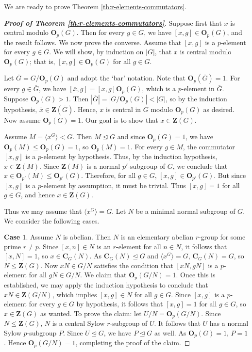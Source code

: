 \documentclass[twoside,a4paper,reqno,12pt]{amsart}
\newcommand{\<}{\langle}
\renewcommand{\>}{\rangle}
\newcommand{\la}{\langle}
\newcommand{\ra}{\rangle}
\newcommand{\leqs}{\leqslant}
\newcommand{\OB}{\mathbf{O}}
\newcommand{\CB}{\mathbf{C}}
\newcommand{\ZB}{\mathbf{Z}}
\renewcommand{\leq}{\leqs}
\renewcommand{\:}{\colon}
\theoremstyle{definition}
\begin{document}
 We are ready to prove Theorem \ref{th:r-elements-commutators}. 
 
 \begin{proof}[\textbf{Proof of Theorem \ref{th:r-elements-commutators}}]
 Suppose first that $x$ is central modulo $\OB_p(G)$. Then for every $g\in G$, we have $[x,g]\in \OB_p(G)$, and the result follows. 
 We now prove the converse. Assume that $[x,g]$ is a $p$-element for every $g\in G$. We will show, by induction on $|G|$, that $x$ is central modulo $\OB_p(G)$; that is, $[x,g]\in \OB_p(G)$ for all $g\in G.$

 
 Let $\overline{G}=G/\OB_p(G)$ and adopt the `bar' notation. Note that $\OB_p(\overline{G})=1$. For every $\overline{g}\in\overline{G}$, we have $[\overline{x},\overline{g}]=[x,g]\OB_p(G)$, which  is a $p$-element in $\overline{G}$. Suppose $\OB_p(G)>1$. Then $|\overline{G}|=|G/\OB_p(G)|<|G|$, so by the induction hypothesis, $\overline{x}\in \ZB(\overline{G})$. Hence, ${x}$ is central in ${G}$ modulo $\OB_p(G)$ as desired.  Now assume $\OB_p(G)=1$. Our goal is to show that $x\in \ZB(G)$.
 
Assume $M=\la x^G\ra<G$. Then $M\unlhd G$ and since $\OB_p(G)=1$, we have $\OB_p(M)\leq \OB_p(G)=1$, so $\OB_p(M)=1$. For every $g\in M$, the commutator  $[x,g]$ is a $p$-element by hypothesis. Thus, by the induction hypothesis,  $x\in \ZB(M)$. Since $\ZB(M)$ is a normal $p'$-subgroup of $G$, we conclude that $x\in \OB_{p'}(M)\leq \OB_{p'}(G)$. Therefore, for all $g\in G$,  $[x,g]\in \OB_{p'}(G)$. But since $[x,g]$ is a $p$-element by assumption, it must be trivial. Thus $[x,g]=1$ for all $g\in G$, and hence $x\in \ZB(G)$. 
 
 
 Thus we may assume that $\la x^G\ra=G$. Let $N$ be a minimal normal subgroup of $G$.  We consider the following cases.
 
 \smallskip
 \textbf{Case $1$}. Assume $N$ is abelian. Then $N$ is an elementary abelian $r$-group for some prime $r\neq p$. Since $[x,n]\in N$ is an $r$-element for all $n\in N$, it follows that $[x,N]=1$, so $x\in \CB_G(N).$ As $\CB_G(N)\unlhd G$ and $\la x^G\ra=G$, $\CB_G(N)=G$, so $N\leq \ZB(G).$ Now $xN\in G/N$ satisfies the condition that $[xN,gN]$ is a $p$-element for all $gN\in G/N.$ We claim that $\OB_p(G/N)=1$. Once this is established, we may apply the induction hypothesis to conclude that $xN\in \ZB(G/N)$, which implies $[x,g]\in N$ for all $g\in G$. Since $[x,g]$ is a $p$-element for every $g\in G$ by hypothesis, it follows that $[x,g]=1$ for all $g\in G$, so  $x\in \ZB(G)$ as wanted.  To prove the claim: let $U/N=\OB_p(G/N)$. Since $N\leq \ZB(G)$, $N$ is a central Sylow $r$-subgroup of $U$. It follows that $U$ has a normal Sylow $p$-subgroup $P$. Since $U\unlhd G$, we have $P\unlhd G$  as well. As $\OB_p(G)=1$, $P=1$. Hence $\OB_p(G/N)=1$, completing the proof of the claim.
 

\end{proof}
\end{document}
